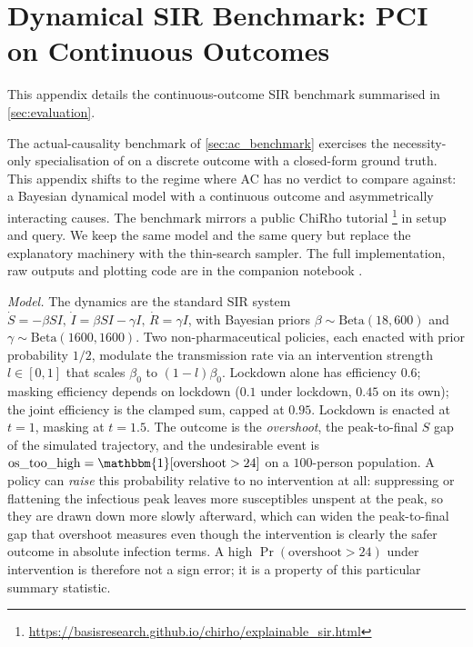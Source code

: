 \section{Dynamical SIR Benchmark: PCI on Continuous Outcomes}\label{sec:sir_benchmark}

This appendix details the continuous-outcome SIR benchmark summarised in \cref{sec:evaluation}.

The actual-causality benchmark of \cref{sec:ac_benchmark} exercises the
necessity-only specialisation of \ourapproach on a discrete outcome with a
closed-form ground truth. This appendix shifts to the regime where AC has no
verdict to compare against: a Bayesian dynamical model with a continuous
outcome and asymmetrically interacting causes. The benchmark mirrors a public
ChiRho tutorial%
\footnote{\url{https://basisresearch.github.io/chirho/explainable_sir.html}}
in setup and query. We keep the same model and
the same query but replace the explanatory machinery with the \ourapproach
thin-search sampler. The full implementation, raw outputs and plotting code
are in the companion notebook
.

\medskip\noindent\textit{Model.}
The dynamics are the standard SIR system
\(\dot S = -\beta S I,\, \dot I = \beta S I - \gamma I,\, \dot R = \gamma I\),
with Bayesian priors $\beta\sim\mathrm{Beta}(18,600)$ and
$\gamma\sim\mathrm{Beta}(1600,1600)$. Two non-pharmaceutical policies, each
enacted with prior probability $1/2$, modulate the transmission rate via an
intervention strength $l\in[0,1]$ that scales $\beta_0$ to $(1-l)\beta_0$.
Lockdown alone has efficiency $0.6$; masking efficiency depends on lockdown
($0.1$ under lockdown, $0.45$ on its own); the joint efficiency is the
clamped sum, capped at $0.95$. Lockdown is enacted at $t=1$, masking at
$t=1.5$. The outcome is the \emph{overshoot}, the peak-to-final $S$ gap
of the simulated trajectory, and the undesirable event is
$\mathrm{os\_too\_high}=\mathbbm{1}[\mathrm{overshoot}>24]$ on a $100$-person
population. A policy can \emph{raise} this probability relative to
no intervention at all: suppressing or flattening the infectious peak leaves
more susceptibles unspent at the peak, so they are drawn down more slowly
afterward, which can widen the peak-to-final gap that overshoot measures even
though the intervention is clearly the safer outcome in absolute infection
terms. A high $\Pr(\mathrm{overshoot}>24)$ under intervention is therefore not
a sign error; it is a property of this particular summary statistic.

